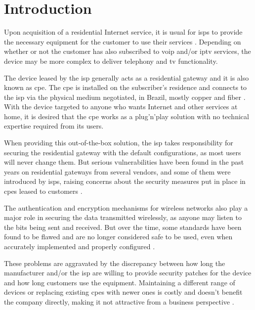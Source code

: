 \section{Introduction}
\label{section:intro}

Upon acquisition of a residential Internet service, it is usual for \glspl{isp} to provide the necessary equipment for the customer to use their services \cite{vivo_agreement,claro_agreement,oi_agreement,tim_agreement}. Depending on whether or not the customer has also subscribed to \gls{voip} and/or \gls{iptv} services, the device may be more complex to deliver telephony and \gls{tv} functionality.

The device leased by the \gls{isp} generally acts as a residential gateway and it is also known as \gls{cpe}. The \gls{cpe} is installed on the subscriber’s residence and connects to the \gls{isp} via the physical medium negotiated, in Brazil, mostly copper and fiber \cite{anatel_bandalargafixa}. With the device targeted to anyone who wants Internet and other services at home, it is desired that the \gls{cpe} works as a plug’n’play solution with no technical expertise required from its users.

When providing this out-of-the-box solution, the \gls{isp} takes responsibility for securing the residential gateway with the default configurations, as most users will never change them. But serious vulnerabilities have been found in the past years on residential gateways from several vendors, and some of them were introduced by \gls{isp}s, raising concerns about the security measures put in place in \glspl{cpe} leased to customers \cite{home_router_security_report}.

The authentication and encryption mechanisms for wireless networks also play a major role in securing the data transmitted wirelessly, as anyone may listen to the bits being sent and received. But over the time, some standards have been found to be flawed and are no longer considered safe to be used, even when accurately implemented and properly configured \cite{removal_of_tkip_from_wifi_devices,wpa3_security_considerations}.

These problems are aggravated by the discrepancy between how long the manufacturer and/or the \gls{isp} are willing to provide security patches for the device and how long customers use the equipment. Maintaining a different range of devices or replacing existing \glspl{cpe} with newer ones is costly and doesn't benefit the company directly, making it not attractive from a business perspective \cite{netgear_security_advisory}.



